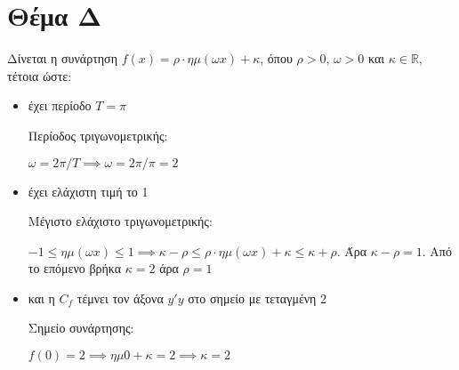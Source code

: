 \documentclass[12pt]{article}
\begin{document}
\section*{Θέμα Δ}
\noindent
Δίνεται η συνάρτηση $f(x)=ρ\cdot ημ(ωx)+κ$, όπου $ρ>0$, $ω>0$ και $κ\in \mathbb{R}$, τέτοια ώστε:
\begin{itemize}
 \item έχει περίοδο $Τ=π$

       Περίοδος τριγωνομετρικής:

       $ω=2π/Τ\implies ω=2π/π=2$

 \item έχει ελάχιστη τιμή το 1

       Μέγιστο ελάχιστο τριγωνομετρικής:

       $-1\le ημ(ωx) \le 1\implies κ-ρ\le ρ\cdot ημ(ωx)+κ \le κ+ρ$. Άρα $κ-ρ=1$. Από το επόμενο βρήκα $κ=2$ άρα $ρ=1$

 \item και η $C_f$ τέμνει τον άξονα $y'y$ στο σημείο με τεταγμένη $2$

       Σημείο συνάρτησης:

       $f(0)=2\implies ημ0+κ=2\implies κ=2$

\end{itemize}
\end{document}
